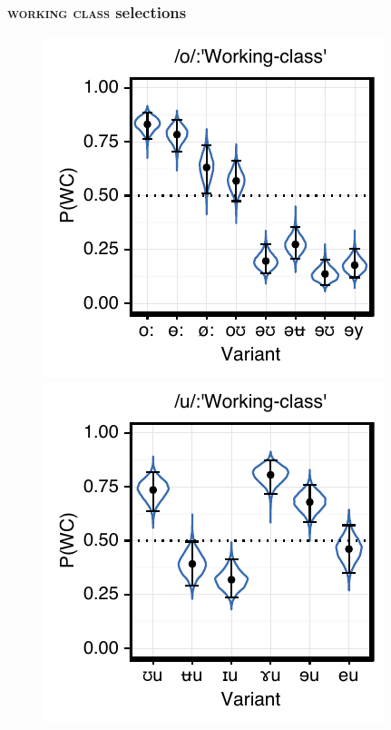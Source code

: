 \documentclass[PWPL]{article}
\begin{document}
\subsubsection{\textsc{working class} selections}
\begin{figure}[H]
\centering
\includegraphics[scale=0.8]{ow_class.pdf}
\includegraphics[scale=0.8]{uw_class.pdf}
\end{figure}
\end{document}
